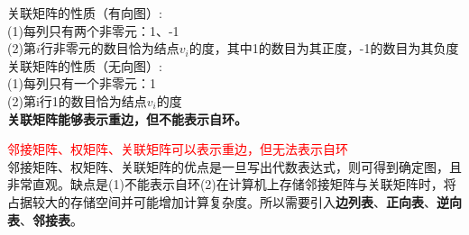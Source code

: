 \documentclass[11pt,a4paper,openany]{book}
\begin{document}
\begin{shaded}
\noindent 关联矩阵的性质（有向图）:\\
(1)每列只有两个非零元：1、-1\\
(2)第$i$行非零元的数目恰为结点$v_i$的度，其中1的数目为其正度，-1的数目为其负度\\
关联矩阵的性质（无向图）:\\
(1)每列只有一个非零元：1\\
(2)第i行1的数目恰为结点$v_i$的度\\
\textbf{关联矩阵能够表示重边，但不能表示自环。}
\end{shaded}

\textcolor{red}{邻接矩阵、权矩阵、关联矩阵可以表示重边，但无法表示自环}\\
邻接矩阵、权矩阵、关联矩阵的优点是一旦写出代数表达式，则可得到确定图，且非常直观。缺点是(1)不能表示自环(2)在计算机上存储邻接矩阵与关联矩阵时，将占据较大的存储空间并可能增加计算复杂度。所以需要引入\textbf{边列表}、\textbf{正向表}、\textbf{逆向表}、\textbf{邻接表}。\\
\end{document}
